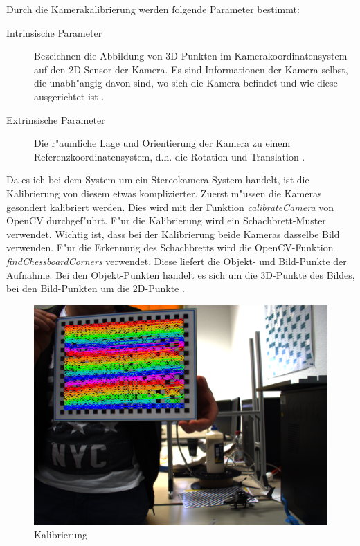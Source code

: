 \noindent Durch die Kamerakalibrierung werden folgende Parameter bestimmt:

\begin{description}
	\item[Intrinsische Parameter]
	Bezeichnen die Abbildung von 3D-Punkten im Kamerakoordinatensystem auf den 2D-Sensor der Kamera. Es sind Informationen der Kamera selbst, die unabh"angig davon sind, wo sich die Kamera befindet und wie diese ausgerichtet ist \cite{Intr}.
	
	\item[Extrinsische Parameter]
	Die r"aumliche Lage und Orientierung der Kamera zu einem Referenzkoordinatensystem, d.h. die Rotation und Translation \cite{cal} \cite{extr}.
\end{description}

\noindent Da es ich bei dem System um ein Stereokamera-System handelt, ist die Kalibrierung von diesem etwas komplizierter.\newline
Zuerst m"ussen die Kameras gesondert kalibriert werden. Dies wird mit der Funktion \textit{calibrateCamera} von OpenCV durchgef"uhrt. F"ur die Kalibrierung wird ein Schachbrett-Muster verwendet. Wichtig ist, dass bei der Kalibrierung beide Kameras dasselbe Bild verwenden. F"ur die Erkennung des Schachbretts wird die OpenCV-Funktion \textit{findChessboardCorners} verwendet. Diese liefert die Objekt- und Bild-Punkte der Aufnahme. Bei den Objekt-Punkten handelt es sich um die 3D-Punkte des Bildes, bei den Bild-Punkten um die 2D-Punkte \cite{OcvD}.

\begin{figure}[H]
	\includegraphics[scale=0.4]{bilder/calibration}
	\caption[Kalibrierung]{Kalibrierung}
\end{figure}

